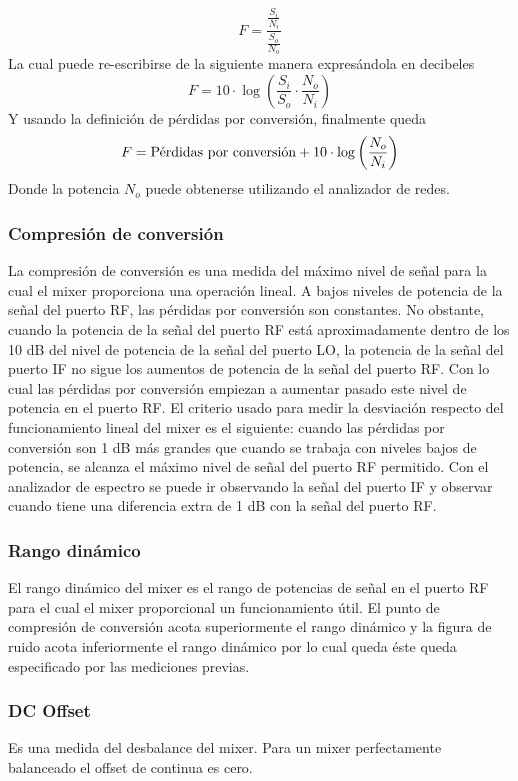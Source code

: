 \documentclass[a4paper,10pt]{article}
\begin{document}
		$$F=\frac{\frac{S_i}{N_i}}{\frac{S_o}{N_o}}$$
		La cual puede re-escribirse de la siguiente manera expres\'andola en decibeles 
		$$F=10\cdot\log\left(\frac{S_i}{S_o}\cdot\frac{N_o}{N_i}\right)$$
		Y usando la definici\'on de p\'erdidas por conversi\'on, finalmente queda
		$$F=\textmd{P\'erdidas por conversi\'on}+10\cdot\log\left(\frac{N_o}{N_i}\right)$$
		Donde la potencia $N_o$ puede obtenerse utilizando el analizador de redes.
		
		\subsubsection{Compresi\'on de conversi\'on}
		La compresi\'on de conversi\'on es una medida del m\'aximo nivel de se\~nal para la cual el mixer proporciona una operaci\'on lineal. A bajos niveles de potencia de la se\~nal del puerto RF, las p\'erdidas por conversi\'on son constantes. No obstante, cuando la potencia de la se\~nal del puerto RF est\'a aproximadamente dentro de los 10 dB del nivel de potencia de la se\~nal del puerto LO, la potencia de la se\~nal del puerto IF no sigue los aumentos de potencia de la se\~nal del puerto RF. Con lo cual las p\'erdidas por conversi\'on empiezan a aumentar pasado este nivel de potencia en el puerto RF. El criterio usado para medir la desviaci\'on respecto del funcionamiento lineal del mixer es el siguiente: cuando las p\'erdidas por conversi\'on son 1 dB m\'as grandes que cuando se trabaja con niveles bajos de potencia, se alcanza el m\'aximo nivel de se\~nal del puerto RF permitido. Con el analizador de espectro se puede ir observando la se\~nal del puerto IF y observar cuando tiene una diferencia extra de 1 dB con la se\~nal del puerto RF. 
		
		\subsubsection{Rango din\'amico}
		El rango din\'amico del mixer es el rango de potencias de se\~nal en el puerto RF para el cual el mixer proporcional un funcionamiento \'util.
		El punto de compresi\'on de conversi\'on acota superiormente el rango din\'amico y la figura de ruido acota inferiormente el rango din\'amico por lo cual queda \'este queda especificado por las mediciones previas.

		\subsubsection{DC Offset}
		Es una medida del desbalance del mixer. Para un mixer perfectamente balanceado el offset de continua es cero.
\end{document}
